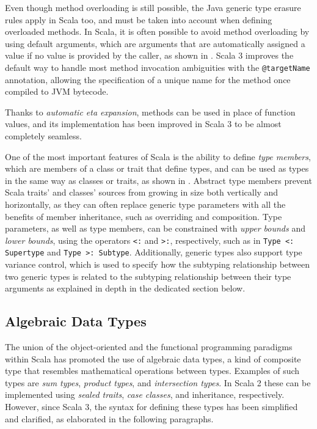 Even though method overloading is still possible, the Java generic type erasure rules apply in Scala too, and must be taken into account when defining overloaded methods.
%
In Scala, it is often possible to avoid method overloading by using default arguments, which are arguments that are automatically assigned a value if no value is provided by the caller, as shown in .
%
Scala 3 improves the default way to handle most method invocation ambiguities with the \texttt{@targetName} annotation, allowing the specification of a unique name for the method once compiled to \ac{JVM} bytecode.

Thanks to \textit{automatic eta expansion}, methods can be used in place of function values, and its implementation has been improved in Scala 3 to be almost completely seamless.

One of the most important features of Scala is the ability to define \textit{type members},
which are members of a class or trait that define types, and can be used as types in the same way as classes or traits, as shown in .
%
Abstract type members prevent Scala traits' and classes' sources from growing in size both vertically and horizontally, as they can often replace generic type parameters with all the benefits of member inheritance, such as overriding and composition.
%
Type parameters, as well as type members, can be constrained with \textit{upper bounds} and \textit{lower bounds}, using the operators \texttt{<:} and \texttt{>:}, respectively, such as in \texttt{Type <: Supertype} and \texttt{Type >: Subtype}.
%
Additionally, generic types also support type variance control, which is used to specify how the subtyping relationship between two generic types is related to the subtyping relationship between their type arguments as explained in depth in the dedicated section below.

\subsection{Algebraic Data Types}

The union of the object-oriented and the functional programming paradigms within Scala has promoted the use of algebraic data types, a kind of composite type that resembles mathematical operations between types.
%
Examples of such types are \textit{sum types}, \textit{product types}, and \textit{intersection types}.
%
In Scala 2 these can be implemented using \textit{sealed traits}, \textit{case classes}, and inheritance, respectively.
%
However, since Scala 3, the syntax for defining these types has been simplified and clarified, as elaborated in the following paragraphs.

